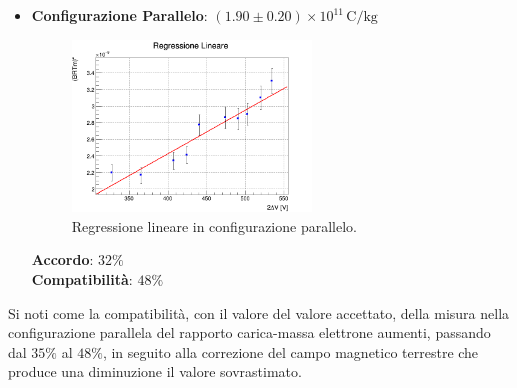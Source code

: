 \documentclass[a4paper,12pt]{article}
\begin{document}
\begin{itemize}
    \item \textbf{Configurazione Parallelo}: \( (1.90 \pm 0.20) \times 10^{11} \, \text{C/kg}\)
    \begin{figure}[H]
        \centering
        \includegraphics[width=0.6\textwidth]{correz_regr_parallelo.png}
        \caption{Regressione lineare in configurazione parallelo.}
        \label{fig:correz_regr_parallelo}
    \end{figure}
    \textbf{Accordo}: \(32\%\) \\
    \textbf{Compatibilità}: \(48\%\)
\end{itemize}
Si noti come la compatibilità, con il valore del valore accettato, della misura nella configurazione parallela del rapporto carica-massa elettrone aumenti, passando dal \(35\%\) al \(48\%\), in seguito alla correzione del campo magnetico terrestre che produce una diminuzione il valore sovrastimato. 
\end{document}
